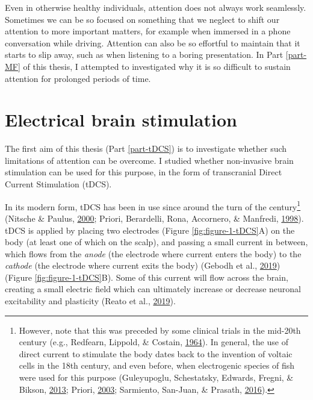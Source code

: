 \documentclass[12pt,a4paper,]{memoir}
\let\rmarkdownfootnote\footnote%
\def\footnote{\protect\rmarkdownfootnote}
\begin{document}
Even in otherwise healthy individuals, attention does not always work seamlessly. Sometimes we can be so focused on something that we neglect to shift our attention to more important matters, for example when immersed in a phone conversation while driving. Attention can also be so effortful to maintain that it starts to slip away, such as when listening to a boring presentation. In Part \ref{part-MF} of this thesis, I attempted to investigated why it is so difficult to sustain attention for prolonged periods of time.

\hypertarget{electrical-brain-stimulation}{%
\section{Electrical brain stimulation}\label{electrical-brain-stimulation}}

The first aim of this thesis (Part \ref{part-tDCS}) is to investigate whether such limitations of attention can be overcome. I studied whether non-invasive brain stimulation can be used for this purpose, in the form of transcranial Direct Current Stimulation (tDCS).

In its modern form, tDCS has been in use since around the turn of the century\footnote{However, note that this was preceded by some clinical trials in the mid-20th century (e.g., Redfearn, Lippold, \& Costain, \protect\hyperlink{ref-Redfearn1964}{1964}). In general, the use of direct current to stimulate the body dates back to the invention of voltaic cells in the 18th century, and even before, when electrogenic species of fish were used for this purpose (Guleyupoglu, Schestatsky, Edwards, Fregni, \& Bikson, \protect\hyperlink{ref-Guleyupoglu2013}{2013}; Priori, \protect\hyperlink{ref-Priori2003}{2003}; Sarmiento, San-Juan, \& Prasath, \protect\hyperlink{ref-Sarmiento2016}{2016}).} (Nitsche \& Paulus, \protect\hyperlink{ref-Nitsche2000}{2000}; Priori, Berardelli, Rona, Accornero, \& Manfredi, \protect\hyperlink{ref-Priori1998}{1998}). tDCS is applied by placing two electrodes (Figure \ref{fig:figure-1-tDCS}A) on the body (at least one of which on the scalp), and passing a small current in between, which flows from the \emph{anode} (the electrode where current enters the body) to the \emph{cathode} (the electrode where current exits the body) (Gebodh et al., \protect\hyperlink{ref-Gebodh2019a}{2019}) (Figure \ref{fig:figure-1-tDCS}B). Some of this current will flow across the brain, creating a small electric field which can ultimately increase or decrease neuronal excitability and plasticity (Reato et al., \protect\hyperlink{ref-Reato2019}{2019}).
\end{document}
